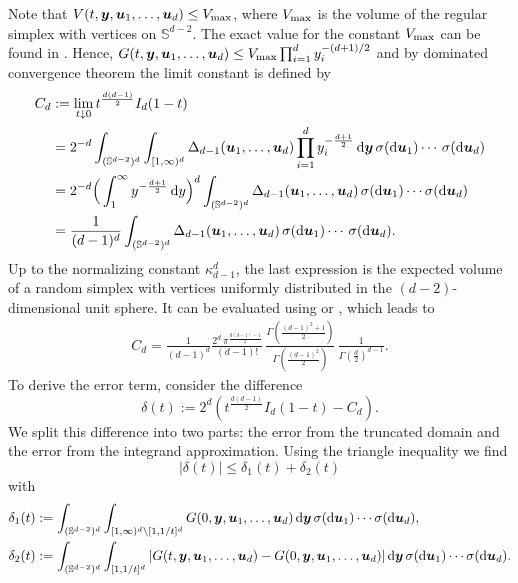 \documentclass[11pt,a4paper]{article}
\theoremstyle{plain}
\theoremstyle{definition}
\theoremstyle{remark}
\newcommand{\dint}{\textup{d}}
\newcommand{\by}{\boldsymbol{y}}
\newcommand{\bu}{\boldsymbol{u}}
\def\SS{\mathbb{S}}
\begin{document}
Note that $V(t,\by,\bu_1,\ldots,\bu_d)\leq V_{\rm max}$, where $V_{\rm max}$ is the volume of the regular simplex with vertices on $\SS^{d-2}$. The exact value for the constant $V_{\rm max}$ can be found in \cite[Proposition 4.21]{KSTBook}. Hence, $G(t,\by,\bu_1,\ldots,\bu_d)\leq  V_{\rm max} \prod_{i=1}^d y_i^{-(d+1)/2}$ and by dominated convergence theorem the limit constant is defined by
\begin{align*}
	C_d & := \lim_{t\downarrow 0} t^{\frac{d(d-1)}{2}} I_d(1-t)                                                                                                                   \\
	    & =
	2^{-d} \int_{(\SS^{d-2})^d}\int_{[1,\infty)^d} \Delta_{d-1}(\bu_1,\ldots,\bu_d) \prod_{i=1}^d y_i^{-\frac{d+1}{2}} \,\dint \by\,\sigma(\dint\bu_1)\cdots \,\sigma(\dint\bu_d) \\
	    & =
	2^{-d}\Big(\int_1^\infty y^{-\frac{d+1}{2}}\,\dint y\Big)^d\int_{(\SS^{d-2})^d}\Delta_{d-1}(\bu_1,\ldots,\bu_d)\,\sigma(\dint\bu_1)\cdots\sigma(\dint\bu_d)                   \\
	    & =
	\frac{1}{(d-1)^d}\int_{(\SS^{d-2})^d}\Delta_{d-1}(\bu_1,\ldots,\bu_d)\,\sigma(\dint\bu_1)\cdots \,\sigma(\dint\bu_d).
\end{align*}
Up to the normalizing constant $\kappa_{d-1}^d$, the last expression is the expected volume of a random simplex with vertices uniformly distributed in the $(d-2)$-dimensional unit sphere. It can be evaluated using \cite[Theorem 4.12]{KSTBook} or \cite[Theorem~8.2.3]{SW}, which leads to
\begin{align}
	C_d = \frac{1}{(d-1)^d}\frac{2^{d}\,\pi^{\frac{d(d-1)-1}{2}}}{(d-1)!}\,
	\frac{\Gamma\!\left(\frac{(d-1)^2+1}{2}\right)}{\Gamma\!\left(\frac{(d-1)^2}{2}\right)}\,
	\frac{1}{\Gamma\!\left(\frac d2\right)^{d-1}}.\label{eq:Cd}
\end{align}
To derive the error term, consider the difference
\[
	\delta(t) := 2^d \left(t^{\frac{d(d-1)}{2}} I_d(1-t) - C_d \right).
\]
We split this difference into two parts: the error from the truncated domain and the error from the integrand approximation. Using the triangle inequality we find
\[
	|\delta(t)| \le \delta_1(t) + \delta_2(t)
\]
with
\begin{align*}
	\delta_1(t) & := \int_{(\SS^{d-2})^d}\int_{[1,\infty)^d \setminus [1,1/t]^d} G(0,\by,\bu_1,\ldots,\bu_d)\,\dint \by\,\sigma(\dint\bu_1)\cdots \sigma(\dint\bu_d),          \\
	\delta_2(t) & := \int_{(\SS^{d-2})^d}\int_{[1,1/t]^d} |G(t,\by,\bu_1,\ldots,\bu_d) - G(0,\by,\bu_1,\ldots,\bu_d)|\,\dint \by\,\sigma(\dint \bu_1)\cdots\sigma(\dint\bu_d).
\end{align*}
\end{document}
